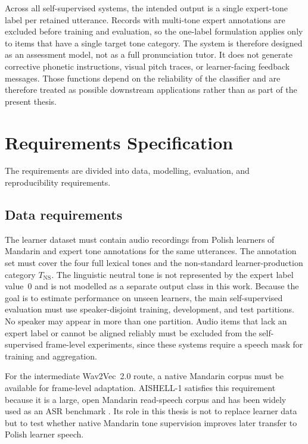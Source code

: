 Across all self-supervised systems, the intended output is a single expert-tone
label per retained utterance. Records with multi-tone expert annotations are
excluded before training and evaluation, so the one-label formulation applies
only to items that have a single target tone category. The system is therefore
designed as an assessment model,
not as a full pronunciation tutor. It does not generate corrective phonetic
instructions, visual pitch traces, or learner-facing feedback messages. Those
functions depend on the reliability of the classifier and are therefore treated
as possible downstream applications rather than as part of the present thesis.

\section{Requirements Specification}
\label{sec:proposal:requirements}

The requirements are divided into data, modelling, evaluation, and
reproducibility requirements.

\subsection{Data requirements}
\label{sec:proposal:requirements:data}

The learner dataset must contain audio recordings from Polish learners of
Mandarin and expert tone annotations for the same utterances. The annotation set
must cover the four full lexical tones and the non-standard learner-production
category \(T_{\mathrm{NS}}\). The linguistic neutral tone is not represented by
the expert label value~0 and is not modelled as a separate output class in this
work. Because the goal is to estimate performance
on unseen learners, the main self-supervised evaluation must use
speaker-disjoint training, development, and test partitions. No speaker may
appear in more than one partition. Audio items that lack an expert label or
cannot be aligned reliably must be excluded from the self-supervised frame-level
experiments, since these systems require a speech mask for training and
aggregation.

For the intermediate Wav2Vec~2.0 route, a native Mandarin corpus must be
available for frame-level adaptation. AISHELL-1 satisfies this requirement
because it is a large, open Mandarin read-speech corpus and has been widely used
as an ASR benchmark \cite{bu2017aishell}. Its role in this thesis is not to
replace learner data but to test whether native Mandarin tone supervision
improves later transfer to Polish learner speech.

